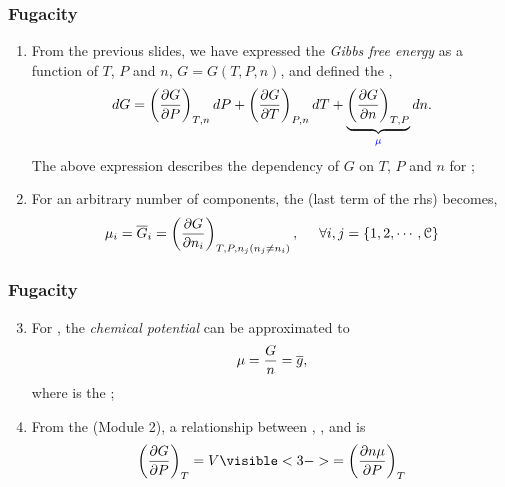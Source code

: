 \documentclass[10pt,compress,unknownkeysallowed]{beamer}
\begin{document}
\begin{frame}
  \frametitle{Fugacity}
        \begin{enumerate}%
           \item<1-> From the previous slides, we have expressed the {\it Gibbs free energy} as a function of $T$, $P$ and $n$, \ie $G=G(T,P,n)$, and defined the ,
              \begin{displaymath}
                dG = \Partial[G]{P}{T,n}dP + \Partial[G]{T}{P,n}dT + \underbrace{\Partial[G]{n}{T,P}}_{\blue{\mu}}dn.
              \end{displaymath}
              The above expression describes the dependency of $G$ on $T$, $P$ and $n$ for ;
           \item<2-> For an arbitrary number of components, the  (\ie last term of the rhs) becomes,
             \begin{displaymath}
               \mu_{i} = \overline{G}_{i}=\Partial[G]{n_{i}}{T,P,n_{j} \left(n_{j}\ne n_{i}\right)}, \hspace{0.5cm} \forall i,j=\left\{1,2,\cdots,\mathcal{C}\right\}
               \end{displaymath}
        \end{enumerate}
\end{frame}
\normalsize


\begin{frame}
  \frametitle{Fugacity}
        \begin{enumerate}\setcounter{enumi}{2}  
           \item<1-> For , the {\it chemical potential} can be approximated to
             \begin{displaymath}
               \mu = \frc{G}{n} = \overline{g},
             \end{displaymath}
             where  is the ;
             
           \item<2-> From the  (Module 2), a relationship between , ,  and  is
             \begin{displaymath}
                \Partial[G]{P}{T} = V \visible<3->{= \Partial[n\mu]{P}{T}}
             \end{displaymath}
               
        \end{enumerate}
\end{frame}
\normalsize
\end{document}
